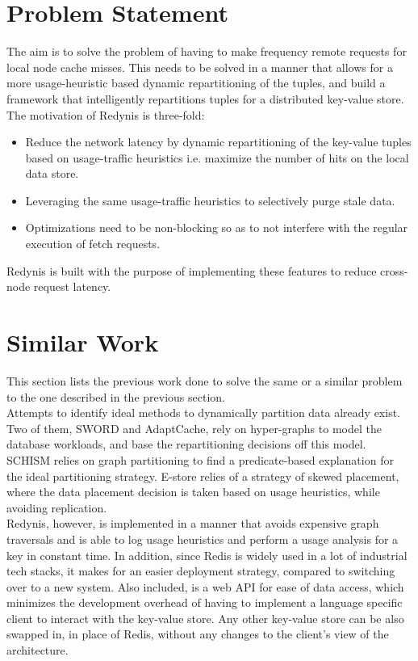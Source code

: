 \documentclass{sig-alternate}
\begin{document}
\section{Problem Statement}
The aim is to solve the problem of having to make frequency remote requests for local node cache misses. This needs to be solved in a manner that allows for a more usage-heuristic based dynamic repartitioning of the tuples, and build a framework that intelligently repartitions tuples for a distributed key-value store.\\

The motivation of Redynis is three-fold:
\begin{itemize}
	\item Reduce the network latency by dynamic repartitioning of the key-value tuples based on usage-traffic heuristics i.e. maximize the number of hits on the local data store.
	\item Leveraging the same usage-traffic heuristics to selectively purge stale data.
	\item Optimizations need to be non-blocking so as to not interfere with the regular execution of fetch requests.
\end{itemize}

Redynis is built with the purpose of implementing these features to reduce cross-node request latency.


\section{Similar Work}
This section lists the previous work done to solve the same or a similar problem to the one described in the previous section.\\

Attempts to identify ideal methods to dynamically partition data already exist. Two of them, SWORD\cite{quamar2013sword} and AdaptCache\cite{asad2016adaptcache}, rely on hyper-graphs to model the database workloads, and base the repartitioning decisions off this model. SCHISM\cite{curino2010schism} relies on graph partitioning to find a predicate-based explanation for the ideal partitioning strategy. E-store\cite{taft2014store} relies of a strategy of skewed placement, where the data placement decision is taken based on usage heuristics, while avoiding replication. \\

Redynis, however, is implemented in a manner that avoids expensive graph traversals and is able to log usage heuristics and perform a usage analysis for a key in constant time. In addition, since Redis is widely used in a lot of industrial tech stacks\cite{redis-popularity}, it makes for an easier deployment strategy, compared to switching over to a new system. Also included, is a web API for ease of data access, which minimizes the development overhead of having to implement a language specific client to interact with the key-value store. Any other key-value store can be also swapped in, in place of Redis, without any changes to the client's view of the architecture.\\
\end{document}
